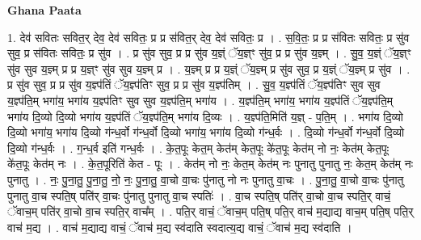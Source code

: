 \documentclass[17pt]{extarticle}
\begin{document}
\textbf{Ghana Paata } \newline

1. देव॑ सवितः सवित॒र् देव॒ देव॑ सवितः॒ प्र प्र स॑वित॒र् देव॒ देव॑ सवितः॒ प्र । . स॒वि॒तः॒ प्र प्र स॑वितः सवितः॒ प्र सु॑व सुव॒ प्र स॑वितः सवितः॒ प्र सु॑व । . प्र सु॑व सुव॒ प्र प्र सु॑व य॒ज्ञ्ं ॅय॒ज्ञ्ꣳ सु॑व॒ प्र प्र सु॑व य॒ज्ञ्म् । . सु॒व॒ य॒ज्ञ्ं ॅय॒ज्ञ्ꣳ सु॑व सुव य॒ज्ञ्म् प्र प्र य॒ज्ञ्ꣳ सु॑व सुव य॒ज्ञ्म् प्र । . य॒ज्ञ्म् प्र प्र य॒ज्ञ्ं ॅय॒ज्ञ्म् प्र सु॑व सुव॒ प्र य॒ज्ञ्ं ॅय॒ज्ञ्म् प्र सु॑व । . प्र सु॑व सुव॒ प्र प्र सु॑व य॒ज्ञ्प॑तिं ॅय॒ज्ञ्प॑तिꣳ सुव॒ प्र प्र सु॑व य॒ज्ञ्प॑तिम् । . सु॒व॒ य॒ज्ञ्प॑तिं ॅय॒ज्ञ्प॑तिꣳ सुव सुव य॒ज्ञ्प॑ति॒म् भगा॑य॒ भगा॑य य॒ज्ञ्प॑तिꣳ सुव सुव य॒ज्ञ्प॑ति॒म् भगा॑य । . य॒ज्ञ्प॑ति॒म् भगा॑य॒ भगा॑य य॒ज्ञ्प॑तिं ॅय॒ज्ञ्प॑ति॒म् भगा॑य दि॒व्यो दि॒व्यो भगा॑य य॒ज्ञ्प॑तिं ॅय॒ज्ञ्प॑ति॒म् भगा॑य दि॒व्यः । . य॒ज्ञ्प॑ति॒मिति॑ य॒ज्ञ् - प॒ति॒म् । . भगा॑य दि॒व्यो दि॒व्यो भगा॑य॒ भगा॑य दि॒व्यो ग॑न्ध॒र्वो ग॑न्ध॒र्वो दि॒व्यो भगा॑य॒ भगा॑य दि॒व्यो ग॑न्ध॒र्वः । . दि॒व्यो ग॑न्ध॒र्वो ग॑न्ध॒र्वो दि॒व्यो दि॒व्यो ग॑न्ध॒र्वः । . ग॒न्ध॒र्व इति॑ गन्ध॒र्वः । . के॒त॒पूः केत॒म् केत॑म् केत॒पूः के॑त॒पूः केत॑म् नो नः॒ केत॑म् केत॒पूः के॑त॒पूः केत॑म् नः । . के॒त॒पूरिति॑ केत - पूः । . केत॑म् नो नः॒ केत॒म् केत॑म् नः पुनातु पुनातु नः॒ केत॒म् केत॑म् नः पुनातु । . नः॒ पु॒ना॒तु॒ पु॒ना॒तु॒ नो॒ नः॒ पु॒ना॒तु॒ वा॒चो वा॒चः पु॑नातु नो नः पुनातु वा॒चः । . पु॒ना॒तु॒ वा॒चो वा॒चः पु॑नातु पुनातु वा॒च स्पति॒ष् पति॑र् वा॒चः पु॑नातु पुनातु वा॒च स्पतिः॑ । . वा॒च स्पति॒ष् पति॑र् वा॒चो वा॒च स्पति॒र् वाचं॒ ॅवाच॒म् पति॑र् वा॒चो वा॒च स्पति॒र् वाच᳚म् । . पति॒र् वाचं॒ ॅवाच॒म् पति॒ष् पति॒र् वाच॑ म॒द्याद्य वाच॒म् पति॒ष् पति॒र् वाच॑ म॒द्य । . वाच॑ म॒द्याद्य वाचं॒ ॅवाच॑ म॒द्य स्व॑दाति स्वदात्य॒द्य वाचं॒ ॅवाच॑ म॒द्य स्व॑दाति । \newline
\end{document}
